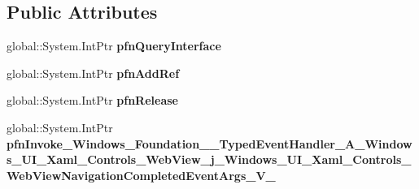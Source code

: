 \subsection*{Public Attributes}
\begin{DoxyCompactItemize}
\item 
\mbox{\label{struct_windows_1_1_foundation_1_1_typed_event_handler___a___windows___u_i___xaml___controls___we5456bcb78d92d2dc8a40fc7f9961d992_a3e6a4d182922f713ecb5db1f76b9336e}} 
global\+::\+System.\+Int\+Ptr {\bfseries pfn\+Query\+Interface}
\item 
\mbox{\label{struct_windows_1_1_foundation_1_1_typed_event_handler___a___windows___u_i___xaml___controls___we5456bcb78d92d2dc8a40fc7f9961d992_a2f91c80e8df651bc21d06818a1495a98}} 
global\+::\+System.\+Int\+Ptr {\bfseries pfn\+Add\+Ref}
\item 
\mbox{\label{struct_windows_1_1_foundation_1_1_typed_event_handler___a___windows___u_i___xaml___controls___we5456bcb78d92d2dc8a40fc7f9961d992_a16ca7713d2d25e8789e2d20e8d90dc51}} 
global\+::\+System.\+Int\+Ptr {\bfseries pfn\+Release}
\item 
\mbox{\label{struct_windows_1_1_foundation_1_1_typed_event_handler___a___windows___u_i___xaml___controls___we5456bcb78d92d2dc8a40fc7f9961d992_a606749f3191da967ccecee9db5a16766}} 
global\+::\+System.\+Int\+Ptr {\bfseries pfn\+Invoke\+\_\+\+Windows\+\_\+\+Foundation\+\_\+\+\_\+\+Typed\+Event\+Handler\+\_\+\+A\+\_\+\+Windows\+\_\+\+U\+I\+\_\+\+Xaml\+\_\+\+Controls\+\_\+\+Web\+View\+\_\+j\+\_\+\+Windows\+\_\+\+U\+I\+\_\+\+Xaml\+\_\+\+Controls\+\_\+\+Web\+View\+Navigation\+Completed\+Event\+Args\+\_\+\+V\+\_\+}
\end{DoxyCompactItemize}
